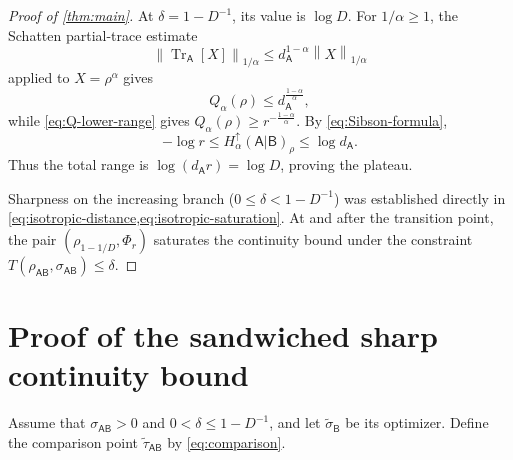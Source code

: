 \documentclass[11pt,reqno]{amsart}
\theoremstyle{definition}
\newtheorem{remark}[remark]{Remark}
\DeclareMathOperator{\Tr}{Tr}
\newcommand{\I}{\mathbf 1}
\newcommand{\A}{\mathsf{A}}
\newcommand{\B}{\mathsf{B}}
\newcommand{\norm}[1]{\left\lVert#1\right\rVert}
\newcommand{\sand}{\widetilde}
\begin{document}
\begin{proof}[Proof of \cref{thm:main}]
At
$\delta=1-D^{-1}$, its value is $\log D$.  For
$1/\alpha \geq 1$, the Schatten partial-trace estimate
\[
\norm{\Tr_{\A}[X]}_{1/\alpha}
\leq d_{\A}^{1-\alpha}\norm{X}_{1/\alpha}
\]
applied to $X=\rho^\alpha$ gives
\begin{equation}\label{eq:partial-trace-Schatten}
	Q_\alpha(\rho)\leq d_{\A}^{\frac{1-\alpha}{\alpha}},
\end{equation}
while \cref{eq:Q-lower-range} gives
$Q_\alpha(\rho)\geq r^{-\frac{1-\alpha}{\alpha}}$.  By
\cref{eq:Sibson-formula},
\begin{equation}\label{eq:entropy-range}
	-\log r
	\leq H_\alpha^\uparrow(\A|\B)_\rho
	\leq\log d_{\A}.
\end{equation}
Thus the total range is $\log(d_{\A}r)=\log D$, proving the plateau.

Sharpness on the increasing branch ($0\leq\delta<1-D^{-1}$) was established directly in
\cref{eq:isotropic-distance,eq:isotropic-saturation}.  At and after the
transition point, the pair $(\rho_{1-1/D},\Phi_r)$ saturates the continuity bound under
the constraint $T(\rho_{\A\B},\sigma_{\A\B})\leq\delta$.
\end{proof}




\section{Proof of the sandwiched sharp continuity bound}\label{sec:sand_main-proof}

Assume that $\sigma_{\A\B}>0$ and
$0<\delta\leq1-D^{-1}$, and let $\sand\sigma_{\B}$ be its optimizer.
Define the comparison point $\sand\tau_{\A\B}$ by \cref{eq:comparison}.
\end{document}

